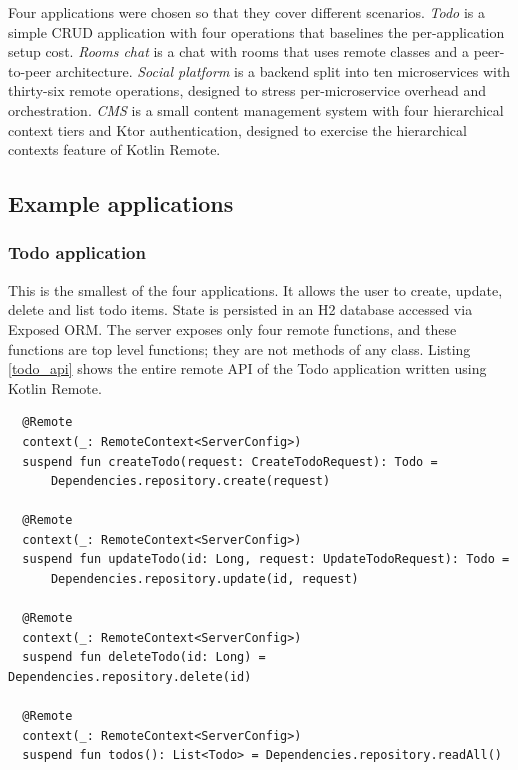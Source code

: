 \documentclass[a4paper,11pt,oneside]{article}
\newcommand{\term}[1]{\textit{#1}}
\begin{document}
Four applications were chosen so that they cover different scenarios. \term{Todo} is a simple
CRUD application with four operations that baselines the per-application setup cost. \term{Rooms
chat} is a chat with rooms that uses remote classes and a peer-to-peer architecture. \term{Social
platform} is a backend split into ten microservices with thirty-six remote operations, designed to stress
per-microservice overhead and orchestration. \term{CMS} is a small content management system
with four hierarchical context tiers and Ktor authentication, designed to exercise the
hierarchical contexts feature of Kotlin Remote.

\subsection{Example applications}

\subsubsection{Todo application}

This is the smallest of the four applications. It allows the user to create, update, delete and list
todo items. State is persisted in an H2 database accessed via Exposed ORM. The server exposes only four
remote functions, and these functions are top level functions; they are not methods of any class.
Listing \ref{todo_api} shows the entire remote API of the Todo application written using Kotlin
Remote.

\begin{listing}[!h]
  \begin{verbatim}
  @Remote
  context(_: RemoteContext<ServerConfig>)
  suspend fun createTodo(request: CreateTodoRequest): Todo =
      Dependencies.repository.create(request)

  @Remote
  context(_: RemoteContext<ServerConfig>)
  suspend fun updateTodo(id: Long, request: UpdateTodoRequest): Todo =
      Dependencies.repository.update(id, request)

  @Remote
  context(_: RemoteContext<ServerConfig>)
  suspend fun deleteTodo(id: Long) = Dependencies.repository.delete(id)

  @Remote
  context(_: RemoteContext<ServerConfig>)
  suspend fun todos(): List<Todo> = Dependencies.repository.readAll()
  \end{verbatim}
  \caption{Todo application remote API in Kotlin Remote}\label{todo_api}
\end{listing}
\end{document}
